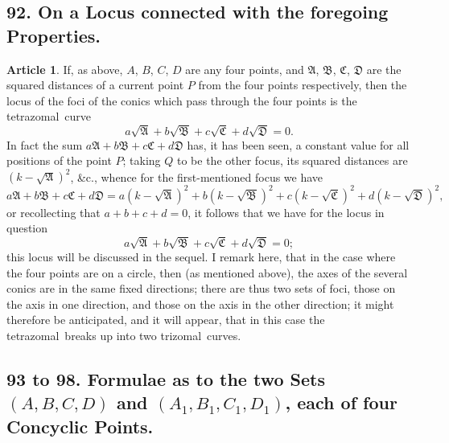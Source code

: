 \documentclass[11pt,a4paper]{article}
\theoremstyle{definition}
\newtheorem{art}{Article}
\newcommand{\trizomal}{trizomal}
\newcommand{\tetrazomal}{tetrazomal}
\begin{document}
\subsection{92. On a Locus connected with the foregoing Properties.}

\begin{art}
If, as above, $A$, $B$, $C$, $D$ are any four points, and $\mathfrak{A}$, $\mathfrak{B}$, $\mathfrak{C}$, $\mathfrak{D}$ are the squared distances of a current point $P$ from the four points respectively, then the locus of the foci of the conics which pass through the four points is the \tetrazomal\ curve
\[
a\sqrt{\mathfrak{A}} + b\sqrt{\mathfrak{B}} + c\sqrt{\mathfrak{C}} + d\sqrt{\mathfrak{D}} = 0.
\]
In fact the sum $a\mathfrak{A} + b\mathfrak{B} + c\mathfrak{C} + d\mathfrak{D}$ has, it has been seen, a constant value for all positions of the point $P$; taking $Q$ to be the other focus, its squared distances are $(k - \sqrt{\mathfrak{A}})^{2}$, \&c., whence for the first-mentioned focus we have
\[
a\mathfrak{A} + b\mathfrak{B} + c\mathfrak{C} + d\mathfrak{D} = a(k - \sqrt{\mathfrak{A}})^{2} + b(k - \sqrt{\mathfrak{B}})^{2} + c(k - \sqrt{\mathfrak{C}})^{2} + d(k - \sqrt{\mathfrak{D}})^{2},
\]
or recollecting that $a + b + c + d = 0$, it follows that we have for the locus in question
\[
a\sqrt{\mathfrak{A}} + b\sqrt{\mathfrak{B}} + c\sqrt{\mathfrak{C}} + d\sqrt{\mathfrak{D}} = 0;
\]
this locus will be discussed in the sequel. I remark here, that in the case where the four points are on a circle, then (as mentioned above), the axes of the several conics are in the same fixed directions; there are thus two sets of foci, those on the axis in one direction, and those on the axis in the other direction; it might therefore be anticipated, and it will appear, that in this case the \tetrazomal\ breaks up into two \trizomal\ curves.
\end{art}

\subsection{93 to 98. Formulae as to the two Sets $(A, B, C, D)$ and $(A_{1}, B_{1}, C_{1}, D_{1})$, each of four Concyclic Points.}
\end{document}
